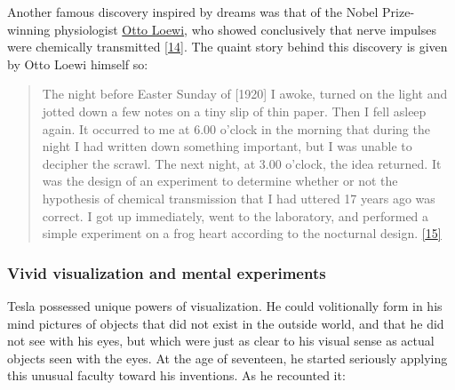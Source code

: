 \documentclass[
  a4paper,
]{article}
\begin{document}
Another famous discovery inspired by dreams was that of the Nobel
Prize-winning physiologist
\href{https://en.wikipedia.org/wiki/Otto_Loewi}{Otto Loewi}, who showed
conclusively that nerve impulses were chemically transmitted
\protect\hyperlink{ref-justin06}{{[}14{]}}. The quaint story behind this
discovery is given by Otto Loewi himself so:

\begin{quote}
The night before Easter Sunday of {[}1920{]} I awoke, turned on the
light and jotted down a few notes on a tiny slip of thin paper. Then I
fell asleep again. It occurred to me at 6.00 o'clock in the morning that
during the night I had written down something important, but I was
unable to decipher the scrawl. The next night, at 3.00 o'clock, the idea
returned. It was the design of an experiment to determine whether or not
the hypothesis of chemical transmission that I had uttered 17 years ago
was correct. I got up immediately, went to the laboratory, and performed
a simple experiment on a frog heart according to the nocturnal design.
\protect\hyperlink{ref-loewi2014}{{[}15{]}}
\end{quote}

\hypertarget{vivid-visualization-and-mental-experiments}{%
\subsubsection{Vivid visualization and mental
experiments}\label{vivid-visualization-and-mental-experiments}}

Tesla possessed unique powers of visualization. He could volitionally
form in his mind pictures of objects that did not exist in the outside
world, and that he did not see with his eyes, but which were just as
clear to his visual sense as actual objects seen with the eyes. At the
age of seventeen, he started seriously applying this unusual faculty
toward his inventions. As he recounted it:
\end{document}
